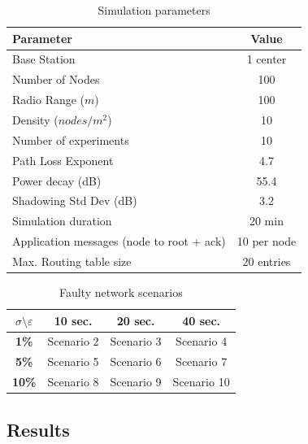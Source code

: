 \begin{table}[!ht]
\centering
\caption{Simulation parameters}
\label{tab:conf}
\begin{tabular}{@{}lc@{}}
\toprule
\multicolumn{1}{l}{\textbf{Parameter}} & \textbf{Value} \\ \midrule
Base Station                           & 1 center       \\
Number of Nodes                        & 100            \\
Radio Range ($m$)                      & 100            \\
Density ($nodes/m^{2}$)                & 10             \\
Number of experiments                              & 10             \\
Path Loss Exponent                     & 4.7            \\
Power decay (dB)                       & 55.4           \\
Shadowing Std Dev (dB)                 & 3.2            \\
Simulation duration                 & 20 min            \\
Application messages (node to root + ack)  & 10 per node \\
Max. Routing table size & 20 entries \\
\bottomrule
\end{tabular}
\end{table}

\begin{table}[]
\centering
\caption{Faulty network scenarios}
\label{tab:scn}
\begin{tabular}{|c|c|c|c|}
\hline
\textbf{$\sigma$$\setminus$$\varepsilon$} & \textbf{10 sec.} & \textbf{20 sec.} & \textbf{40 sec.}\\ \hline
\textbf{1\%}     & Scenario 2            & Scenario 3        & Scenario 4              \\ \hline
\textbf{5\%}     & Scenario 5            & Scenario 6        & Scenario 7             \\ \hline
\textbf{10\%}    & Scenario 8            & Scenario 9        & Scenario 10              \\ \hline
\end{tabular}
\end{table}


\subsection{Results}\label{subsec:res}

